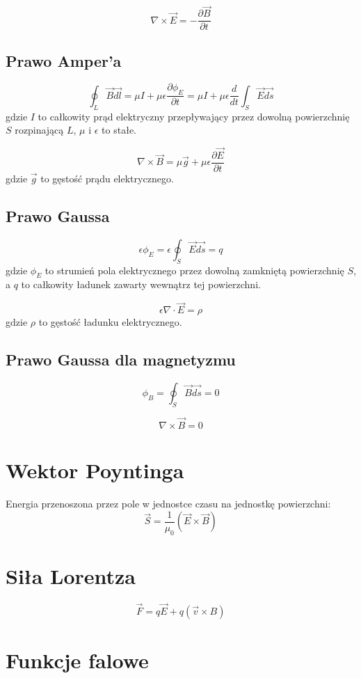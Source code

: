 \documentclass{../notatki}
\begin{document}
$$
\nabla \times \vec{E} = - \frac{\partial \vec{B}}{\partial t}
$$

\subsection{Prawo Amper'a}

$$
\oint_L \vec{B} \vec{dl} = \mu I + \mu \epsilon \frac{\partial
\phi_E}{\partial t} = \mu I + \mu \epsilon \frac{d
}{dt} \int_S \vec{E} \vec{ds}
$$
gdzie $I$ to całkowity prąd elektryczny przepływający przez dowolną powierzchnię
$S$ rozpinającą $L$, $\mu$ i $\epsilon$ to stałe.

$$
\nabla \times \vec{B} = \mu \vec{g} + \mu \epsilon \frac{\partial
\vec{E}}{\partial t}
$$
gdzie $\vec{g}$ to gęstość prądu elektrycznego.

\subsection{Prawo Gaussa}

$$
\epsilon \phi_E = \epsilon \oint_S \vec{E} \vec{ds} = q
$$
gdzie $\phi_E$ to strumień pola elektrycznego przez dowolną zamkniętą
powierzchnię $S$, a $q$ to całkowity ładunek zawarty wewnątrz tej powierzchni.

$$
\epsilon \nabla \cdot \vec{E} = \rho
$$
gdzie $\rho$ to gęstość ładunku elektrycznego.

\subsection{Prawo Gaussa dla magnetyzmu}

$$
\phi_B = \oint_S \vec{B} \vec{ds}  = 0
$$

$$
\nabla \times \vec{B} = 0
$$

\section{Wektor Poyntinga}

Energia przenoszona przez pole w jednostce czasu na jednostkę powierzchni:
$$
\vec{S} = \frac{1}{\mu_0}(\vec{E} \times \vec{B})
$$

\section{Siła Lorentza}

$$
\vec{F} = q \vec{E} + q(\vec{v} \times B)
$$

\section{Funkcje falowe}
\end{document}
